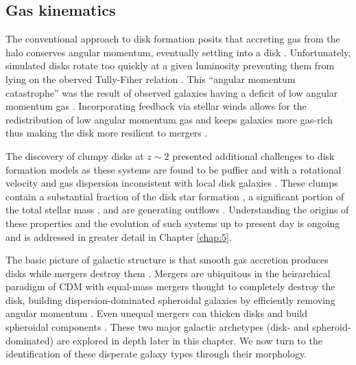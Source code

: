 \subsection{Gas kinematics}

The conventional approach to disk formation posits that accreting gas from the halo conserves angular momentum, eventually settling into a disk \citep{Fall1980,Mo1998}. Unfortunately, simulated disks rotate too quickly at a given luminosity preventing them from lying on the oberved Tully-Fiher relation \citep[e.g, review by][]{Brooks2010}. This ``angular momentum catastrophe'' was the result of observed galaxies having a deficit of low angular momentum gas \citep{Bullock2001,vandenBosch2001}. Incorporating feedback via stellar winds allows for the redistribution of low angular momentum gas and keeps galaxies more gas-rich thus making the disk more resilient to mergers \citep{Governato2009,Robertson2006,Brook2012}. 

The discovery of clumpy disks at $z\sim2$ \citep{Elmegreen2005} presented additional challenges to disk formation models as these systems are found to be puffier and with a rotational velocity and gas dispersion inconsistent with local disk galaxies \citep{ForsterSchreiber2009}. These clumps contain a substantial fraction of the disk star formation \citep{Guo2012}, a significant portion of the total stellar mass \citep{WuFoSch2012}, and are generating outflows \citep{Genzel2011}. Understanding the origins of these properties and the evolution of such systems up to present day is ongoing and is addressed in greater detail in Chapter \ref{chap:5}. 


The basic picture of galactic structure is that smooth gas accretion produces disks while mergers destroy them \citep{Toomre1977}. Mergers are ubiquitous in the heirarchical paradigm of CDM with equal-mass mergers thought to completely destroy the disk, building dispersion-dominated spheroidal galaxies by efficiently removing angular momentum \citep{Barnes1992,Mihos1996}. Even unequal mergers can thicken disks and build spheroidal components \citep{Moster2010}. These two major galactic archetypes (disk- and spheroid-dominated) are explored in depth later in this chapter. We now turn to the identification of these disperate galaxy types through their morphology.




